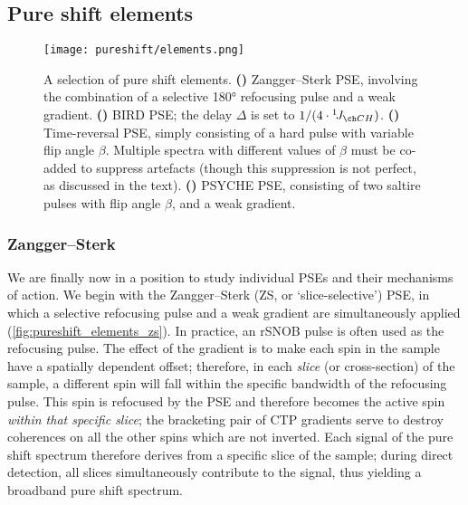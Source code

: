 \subsection{Pure shift elements}
\label{subsec:pureshift__elements}

\begin{figure}[htbp]
    \centering
    \texttt{[image: pureshift/elements.png]}%
    {\label{fig:pureshift_elements_zs}}%
    {\label{fig:pureshift_elements_bird}}%
    {\label{fig:pureshift_elements_tr}}%
    {\label{fig:pureshift_elements_psyche}}%
    \caption[Pure shift elements]{
        A selection of pure shift elements.
        \textbf{()} Zangger--Sterk PSE\autocite{Zangger1997JMR}, involving the combination of a selective \ang{180} refocusing pulse and a weak gradient.
        \textbf{()} BIRD PSE\autocite{Garbow1982CPL,Aguilar2011ACIE}; the delay $\Delta$ is set to $1/(4 \cdot \oneJ{CH})$.
        \textbf{()} Time-reversal PSE\autocite{Sorensen1985JACS}, simply consisting of a hard pulse with variable flip angle $\beta$. Multiple spectra with different values of $\beta$ must be co-added to suppress artefacts (though this suppression is not perfect, as discussed in the text).
        \textbf{()} PSYCHE PSE\autocite{Foroozandeh2014ACIE}, consisting of two saltire pulses\autocite{Foroozandeh2018CEJ,Foroozandeh2020JMR} with flip angle $\beta$, and a weak gradient.
    }
    \label{fig:pureshift_elements}
\end{figure}


\subsubsection{Zangger--Sterk}

We are finally now in a position to study individual PSEs and their mechanisms of action.
We begin with the Zangger--Sterk (ZS, or `slice-selective') PSE\autocite{Zangger1997JMR}, in which a selective refocusing pulse and a weak gradient are simultaneously applied (\cref{fig:pureshift_elements_zs}).
In practice, an rSNOB pulse\autocite{Kupce1995JMRSB} is often used as the refocusing pulse.
The effect of the gradient is to make each spin in the sample have a spatially dependent offset; therefore, in each \textit{slice} (or cross-section) of the sample, a different spin will fall within the specific bandwidth of the refocusing pulse.
This spin is refocused by the PSE and therefore becomes the active spin \textit{within that specific slice}; the bracketing pair of CTP gradients serve to destroy coherences on all the other spins which are not inverted.
Each signal of the pure shift spectrum therefore derives from a specific slice of the sample; during direct detection, all slices simultaneously contribute to the signal, thus yielding a broadband pure shift spectrum.

